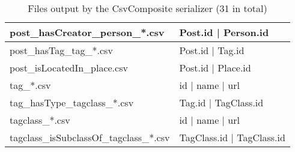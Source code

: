 \begin{table}[htb]
\begin{tabular}{|p{4.6cm}|p{11.4cm}|}
    	post\_hasCreator\_person\_*.csv          & Post.id | Person.id                                                                                         \\ \hline
    	post\_hasTag\_tag\_*.csv                 & Post.id | Tag.id                                                                                            \\ \hline
    	post\_isLocatedIn\_place.csv             & Post.id | Place.id                                                                                          \\ \hline
    	tag\_*.csv                               & id | name | url                                                                                             \\ \hline
    	tag\_hasType\_tagclass\_*.csv            & Tag.id | TagClass.id                                                                                        \\ \hline
    	tagclass\_*.csv                          & id | name | url                                                                                             \\ \hline
    	tagclass\_isSubclassOf\_tagclass\_*.csv  & TagClass.id | TagClass.id                                                                                   \\ \hline
    \end{tabular}
    \caption{Files output by the CsvComposite serializer (31 in total)}
    \label{table:csv_composite}
\end{table}
